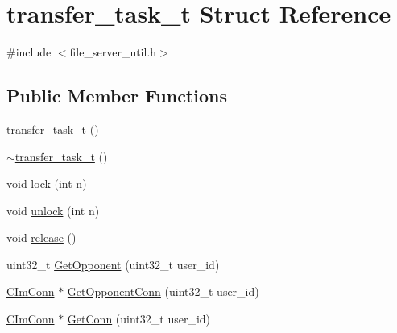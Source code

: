 \hypertarget{structtransfer__task__t}{}\section{transfer\+\_\+task\+\_\+t Struct Reference}
\label{structtransfer__task__t}


{\ttfamily \#include $<$file\+\_\+server\+\_\+util.\+h$>$}

\subsection*{Public Member Functions}
\begin{DoxyCompactItemize}
\item 
\hyperlink{structtransfer__task__t_a800fea2fd204ee0fa62a46f7d9fbfdc2}{transfer\+\_\+task\+\_\+t} ()
\item 
\hyperlink{structtransfer__task__t_a7e94811197d009adec13b229b844e6a9}{$\sim$transfer\+\_\+task\+\_\+t} ()
\item 
void \hyperlink{structtransfer__task__t_a48de1065c9d8a568a3395f4141b463e9}{lock} (int n)
\item 
void \hyperlink{structtransfer__task__t_aa8ac84dfe27a74fdd3d034409bb68980}{unlock} (int n)
\item 
void \hyperlink{structtransfer__task__t_a29553613bd6b932665f59c1fb0c09acf}{release} ()
\item 
uint32\+\_\+t \hyperlink{structtransfer__task__t_a137b1ed25d8fe269dc8677111f9d544d}{Get\+Opponent} (uint32\+\_\+t user\+\_\+id)
\item 
\hyperlink{class_c_im_conn}{C\+Im\+Conn} $\ast$ \hyperlink{structtransfer__task__t_a65b69d712dc23f2aee0b8ceaab5e9ff1}{Get\+Opponent\+Conn} (uint32\+\_\+t user\+\_\+id)
\item 
\hyperlink{class_c_im_conn}{C\+Im\+Conn} $\ast$ \hyperlink{structtransfer__task__t_a09a40059d36bfca8462dc8832828ad55}{Get\+Conn} (uint32\+\_\+t user\+\_\+id)
\end{DoxyCompactItemize}
